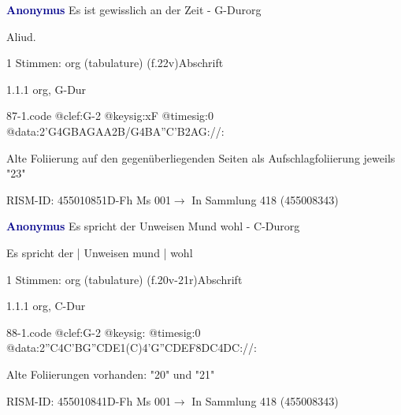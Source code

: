 \documentclass[twocolumn]{book}
\begin{document}
\par \vspace{7pt} \textcolor{darkblue}{\textbf{Anonymus  }}\hfillplus{\textbf{[87]}}\newline Es ist gewisslich an der Zeit - G-Dur\newline org
\par \begin{itshape}[f.22v, at left:] Aliud.\end{itshape} 
\par \textcolor{darkblue}{}  1 Stimmen: org (tabulature)  (f.22v)\newline Abschrift
\par 1.1.1  org, G-Dur  
\begin{filecontents*}{87-1.code}
@clef:G-2
@keysig:xF
@timesig:0
@data:2'G4GBAGAA2B/G4BA''C'B2AG://:
\end{filecontents*}
\newline
%
\par Alte Foliierung auf den gegenüberliegenden Seiten als Aufschlagfoliierung jeweils "23"
\par RISM-ID: 455010851\newline D-Fh  Ms 001\newline $\rightarrow$ In Sammlung 418 (455008343)
      
\par \vspace{7pt} \textcolor{darkblue}{\textbf{Anonymus  }}\hfillplus{\textbf{[88]}}\newline Es spricht der Unweisen Mund wohl - C-Dur\newline org
\par \begin{itshape}[f.20v, at left:] Es spricht der | Unweisen mund | wohl\end{itshape} 
\par \textcolor{darkblue}{}  1 Stimmen: org (tabulature)  (f.20v-21r)\newline Abschrift
\par 1.1.1  org, C-Dur  
\begin{filecontents*}{88-1.code}
@clef:G-2
@keysig:
@timesig:0
@data:2''C4C'BG''CDE1(C)4'G''CDEF{8DC}4DC://:
\end{filecontents*}
\newline
%
\par Alte Foliierungen vorhanden: "20" und "21"
\par RISM-ID: 455010841\newline D-Fh  Ms 001\newline $\rightarrow$ In Sammlung 418 (455008343)
      
\end{document}
